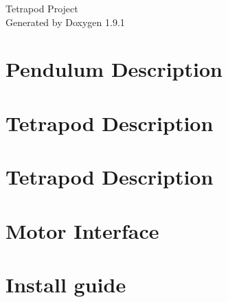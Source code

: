 \let\mypdfximage\pdfximage\def\pdfximage{\immediate\mypdfximage}\documentclass[twoside]{book}
\newcommand{\+}{\discretionary{\mbox{\scriptsize$\hookleftarrow$}}{}{}}
\newcommand{\clearemptydoublepage}{%
  \newpage{\pagestyle{empty}\cleardoublepage}%
}
\begin{document}
\raggedbottom

\hypersetup{pageanchor=false,
             bookmarksnumbered=true,
             pdfencoding=unicode
            }
\begin{titlepage}
\vspace*{7cm}
\begin{center}%
{\Large Tetrapod Project }\\
\vspace*{1cm}
{\large Generated by Doxygen 1.9.1}\\
\end{center}
\end{titlepage}
\clearemptydoublepage
{}
\tableofcontents
\clearemptydoublepage
{}
\hypersetup{pageanchor=true}

\chapter{Pendulum Description}
\label{md_catkin_ws_src_simulator_pendulum_description_README}

\chapter{Tetrapod Description}
\label{md_catkin_ws_src_simulator_single_leg_description_README}

\chapter{Tetrapod Description}
\label{md_catkin_ws_src_simulator_tetrapod_description_README}

\chapter{Motor Interface}
\label{md_Arduino_libraries_motor_driver_README}

\chapter{Install guide}
\label{md_docs_markdown_install_guide}

\end{document}
